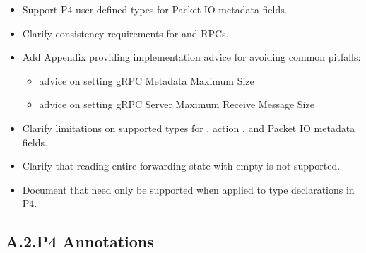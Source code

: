 \documentclass[11pt]{article}
\begin{document}
{\begin{itemize}[noitemsep,topsep=\mdcompacttopsep]
\item{}Support P4 user-defined types for Packet IO metadata fields.%

\item{}Clarify consistency requirements for  and  RPCs.%

\item{}Add Appendix providing implementation advice for avoiding common pitfalls:

\begin{itemize}[noitemsep,topsep=\mdcompacttopsep]%

\item{}advice on setting gRPC Metadata Maximum Size%

\item{}advice on setting gRPC Server Maximum Receive Message Size%
\end{itemize}%

\item{}Clarify limitations on supported types for , action , and
Packet IO metadata fields.%

\item{}Clarify that reading entire forwarding state with empty  is not
supported.%

\item{}Document that  need only be supported when applied to
type declarations in P4.%
\end{itemize}%

\subsection{A.2.\hspace*{0.5em}P4 Annotations}\label{sec-p4-annotations}%

}
\end{document}
